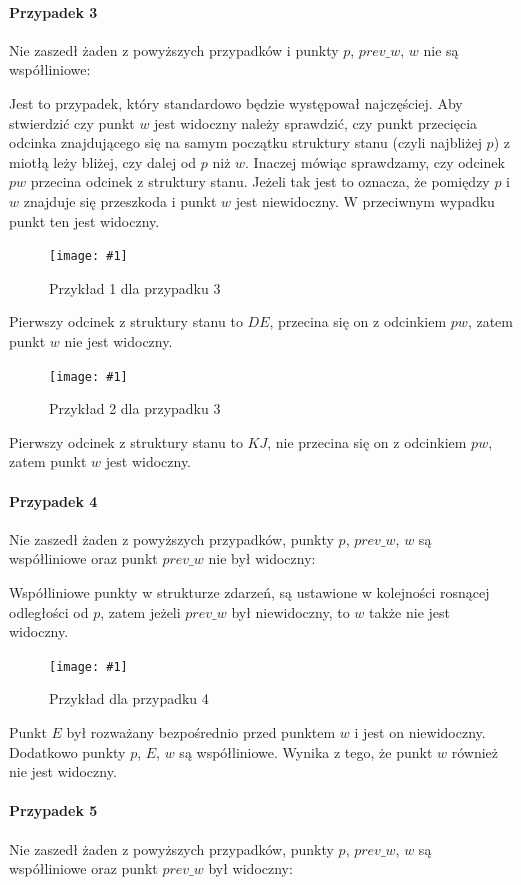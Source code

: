 \documentclass[12pt]{article}
\newcommand{\imgcustomsize}[3]{
	\begin{figure}[H]
		\centering
		\texttt{[image: \#1]}
		\caption{#2}
		\label{#1}
	\end{figure}
}
\newcommand{\img}[2]{\imgcustomsize{#1}{#2}{0.5}}
\begin{document}
			\paragraph{Przypadek 3}
			Nie zaszedł żaden z powyższych przypadków i punkty $ p $, $ prev\_w $, $ w $ nie są współliniowe:
			
			\vspace{\baselineskip} %
			Jest to przypadek, który standardowo będzie występował najczęściej. Aby stwierdzić czy punkt $ w $ jest widoczny należy sprawdzić, czy punkt przecięcia odcinka znajdującego się na samym początku struktury stanu (czyli najbliżej $ p $) z miotłą leży bliżej, czy dalej od $ p $ niż $ w $. Inaczej mówiąc sprawdzamy, czy odcinek $ pw $ przecina odcinek z struktury stanu. Jeżeli tak jest to oznacza, że pomiędzy $ p $ i $ w $ znajduje się przeszkoda i punkt $ w $ jest niewidoczny. W przeciwnym wypadku punkt ten jest widoczny.
			
			\img{przypadek3.1.jpg}{Przykład 1 dla przypadku 3}
			
			Pierwszy odcinek z struktury stanu to $ DE $, przecina się on z odcinkiem $ pw $, zatem punkt $ w $ nie jest widoczny.
			
			\img{przypadek3.2.jpg}{Przykład 2 dla przypadku 3}
			
			Pierwszy odcinek z struktury stanu to $ KJ $, nie przecina się on z odcinkiem $ pw $, zatem punkt $ w $ jest widoczny.
			
			\paragraph{Przypadek 4}
			Nie zaszedł żaden z powyższych przypadków, punkty $ p $, $ prev\_w $, $ w $ są współliniowe oraz punkt $ prev\_w $ nie był widoczny:
			
			\vspace{\baselineskip} %
			Współliniowe punkty w strukturze zdarzeń, są ustawione w kolejności rosnącej odległości od $ p $, zatem jeżeli $ prev\_w $ był niewidoczny, to $ w $ także nie jest widoczny.
			
			\img{przypadek4.jpg}{Przykład dla przypadku 4}
			
			Punkt $ E $ był rozważany bezpośrednio przed punktem $ w $ i jest on niewidoczny. Dodatkowo punkty $ p $, $ E $, $ w $ są współliniowe. Wynika z tego, że punkt $ w $ również nie jest widoczny.
			
			\paragraph{Przypadek 5}
			Nie zaszedł żaden z powyższych przypadków, punkty $ p $, $ prev\_w $, $ w $ są współliniowe oraz punkt $ prev\_w $ był widoczny:
			
\end{document}

